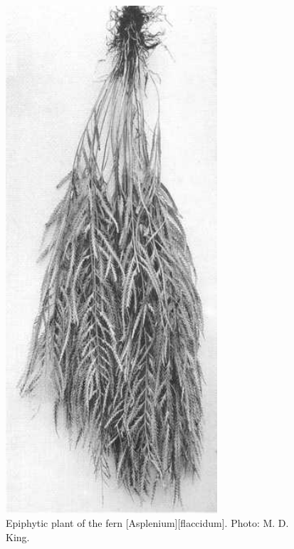 \begin{figure}[htb]
\begin{minipage}[t]{0.427\textwidth}
    	\includegraphics[width=0.7\textwidth]{graphics/figure43asplenium-jlaccidum.jpg}
    	\caption[Epiphytic plant of the fern \emph{Asplenium flaccidum}]{Epiphytic plant of the fern [Asplenium][flaccidum].
    	Photo: M. D. King.}%
    	\label{fig:43asplenium-jlaccidum}
	\end{minipage}
\end{figure}


